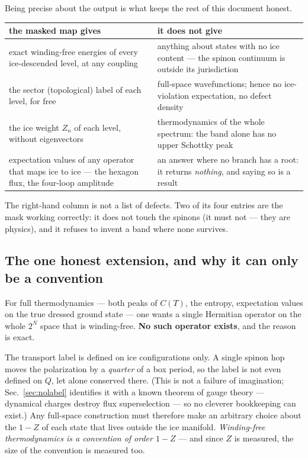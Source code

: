 \documentclass[11pt,a4paper]{article}
\begin{document}
Being precise about the output is what keeps the rest of this document
honest.

\begin{center}
\small
\begin{tabular}{p{6.6cm}p{7.6cm}}
\toprule
\textbf{the masked map gives} & \textbf{it does not give}\\
\midrule
exact winding-free energies of every ice-descended level, at any coupling
& anything about states with no ice content --- the spinon continuum is
outside its jurisdiction\\[2pt]
the sector (topological) label of each level, for free
& full-space wavefunctions; hence no ice-violation expectation, no defect
density\\[2pt]
the ice weight $Z_n$ of each level, without eigenvectors
& thermodynamics of the whole spectrum: the band alone has no upper
Schottky peak\\[2pt]
expectation values of any operator that maps ice to ice --- the hexagon
flux, the four-loop amplitude
& an answer where no branch has a root: it returns \emph{nothing}, and
saying so is a result\\
\bottomrule
\end{tabular}
\end{center}

The right-hand column is not a list of defects.  Two of its four entries are
the mask working correctly: it does not touch the spinons (it must not ---
they are physics), and it refuses to invent a band where none survives.

\subsection{The one honest extension, and why it can only be a convention}
\label{sec:hc}

For full thermodynamics --- both peaks of $C(T)$, the entropy, expectation
values on the true dressed ground state --- one wants a single Hermitian
operator on the whole $2^N$ space that is winding-free.  \textbf{No such
operator exists}, and the reason is exact.

The transport label is defined on ice configurations only.  A single spinon
hop moves the polarization by a \emph{quarter} of a box period, so the label
is not even defined on $Q$, let alone conserved there.  (This is not a
failure of imagination; Sec.~\ref{sec:nolabel} identifies it with a known
theorem of gauge theory --- dynamical charges destroy flux superselection ---
so no cleverer bookkeeping can exist.)  Any full-space
construction must therefore make an arbitrary choice about the $1-Z$ of each
state that lives outside the ice manifold.  \emph{Winding-free
thermodynamics is a convention of order $1-Z$} --- and since $Z$ is
measured, the size of the convention is measured too.
\end{document}
